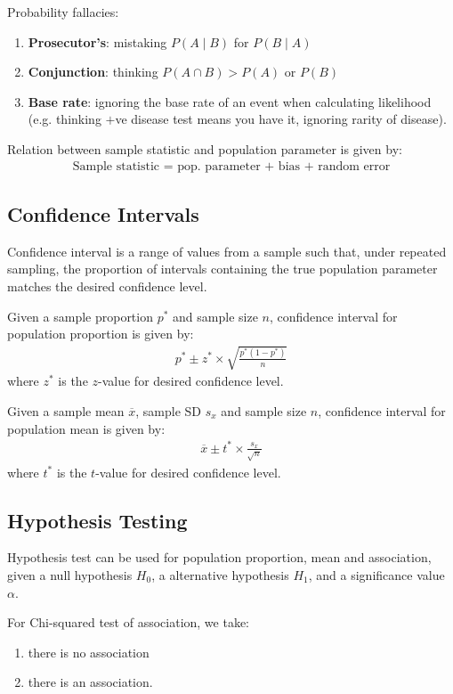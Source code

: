 \documentclass[12pt, a4paper]{article}
\begin{document}
\begin{multicols*}{3}
Probability fallacies:
\begin{enumerate}[\roman*.]
  \item \textbf{Prosecutor's}: mistaking $P(A\mid B)$ for $P(B\mid A)$
  \item \textbf{Conjunction}: thinking $P(A\cap B) > P(A)$ or $P(B)$ 
  \item \textbf{Base rate}: ignoring the base rate of an event when calculating likelihood (e.g. thinking $+$ve disease test means you have it, ignoring rarity of disease).
\end{enumerate}
\colbreak
Relation between sample statistic and population parameter is given by:
\begin{align*}
  \text{Sample statistic = pop. parameter + bias + random error}
\end{align*}

\subsection{Confidence Intervals}
Confidence interval is a range of values from a sample such that, under repeated sampling, the proportion of intervals containing the true population parameter matches the desired confidence level.

Given a sample proportion $p^*$ and sample size $n$, confidence interval for population proportion is given by:
\begin{align*}
  p^* \pm z^* \times \sqrt{\frac{p^*(1-p^*)}{n}}
\end{align*}
where $z^*$ is the $z$-value for desired confidence level.

Given a sample mean $\overline{x}$, sample SD $s_x$ and sample size $n$, confidence interval for population mean is given by:
\begin{align*}
  \overline{x} \pm t^* \times \frac{s_x}{\sqrt{n}}
\end{align*}
where $t^*$ is the $t$-value for desired confidence level.

\subsection{Hypothesis Testing}
Hypothesis test can be used for population proportion, mean and association, given a null hypothesis $H_0$, a alternative hypothesis $H_1$, and a significance value $\alpha$.

For Chi-squared test of association, we take:
\begin{enumerate}[$H_{\arabic*}$:]
  \addtocounter{enumi}{-1}
  \item there is no association
  \item there is an association.  
\end{enumerate}


\end{multicols*}
\end{document}

